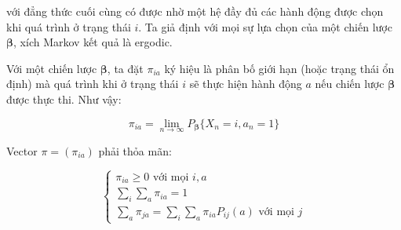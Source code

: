 \documentclass[14pt, a4paper]{article}
\numberwithin{equation}{section}
\numberwithin{figure}{section}
\theoremstyle{sltheorem}
\theoremstyle{soltheorem}
\numberwithin{dl}{section}
\numberwithin{md}{section}
\numberwithin{vd}{section}
\begin{document}
    với đẳng thức cuối cùng có được nhờ một hệ đầy đủ các hành động được chọn khi quá trình ở trạng thái $i$.
    Ta giả định với mọi sự lựa chọn của một chiến lược $\boldsymbol{\beta}$, xích Markov kết quả là ergodic.

    Với một chiến lược $\boldsymbol{\beta}$, ta đặt $\pi_{ia}$ ký hiệu là phân bố giới hạn (hoặc trạng thái ổn định) mà quá trình khi ở trạng thái $i$ sẽ thực hiện hành động $a$ nếu chiến lược $\boldsymbol{\beta}$ được thực thi.
    Như vậy:

    \begin{equation*}
        \pi_{ia} = \lim_{n \rightarrow \infty} P_{\boldsymbol{\beta}} \lbrace X_n = i, a_n = 1 \rbrace
    \end{equation*}

    Vector $\pi = (\pi_{ia})$ phải thỏa mãn:

    \begin{equation}
        \begin{cases}
            \pi_{ia} \geq 0 \text{ với mọi } i, a \\
            \sum_{i} \sum_{a} \pi_{ia} = 1 \\
            \sum_a \pi_{ja} = \sum_i \sum_a \pi_{ia} P_{ij} (a) \text{ với mọi } j
        \end{cases}
    \end{equation}
\end{document}
